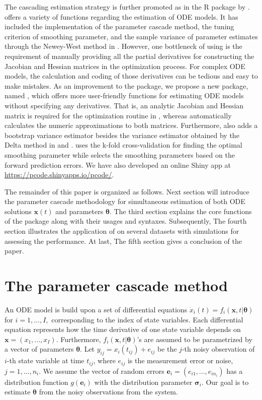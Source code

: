The cascading estimation strategy is further promoted as in the R package  by \cite{CollocInfer}.  offers a variety of functions regarding the estimation of ODE models. It has included the implementation of the parameter cascade method, the tuning criterion of smoothing parameter, and the sample variance of parameter estimates through the Newey-West method in \cite{neweywest}. However, one bottleneck of using  is the requirement of manually providing all the partial derivatives for constructing the Jacobian and Hessian matrices in the optimization process. For complex ODE models, the calculation and coding of those derivatives can be tedious and easy to make mistakes. As an improvement to the  package, we propose a new package, named , which offers more user-friendly functions for estimating ODE models without specifying any derivatives. That is, an analytic Jacobian and Hessian matrix is required for the optimization routine in , whereas  automatically calculates the numeric approximations to both matrices. Furthermore,  also adds a bootstrap variance estimator besides the variance estimator obtained by the Delta method in \cite{parcascade} and .  uses the k-fold cross-validation for finding the optimal smoothing parameter while  selects the smoothing parameters based on the forward prediction errors. We have also developed an online Shiny app at \url{https://pcode.shinyapps.io/pcode/}.

The remainder of this paper is organized as follows. Next section will introduce the parameter cascade methodology for simultaneous estimation of both ODE solutions $\bm{x}(t)$ and parameters $\bm{\theta}$. The third section explains the core functions of the package  along with their usages and syntaxes. Subsequently, The fourth section illustrates the application of  on several datasets with simulations for assessing the performance. At last, The fifth section gives a conclusion of the paper. 


\section{The parameter cascade method} \label{seq:method}
An ODE model is build upon a set of differential equations $\dot{x}_{i}(t) = f_{i}(\bm{x},t|\bm{\theta})$ for $i = 1,..., I,$ corresponding to the index of state variables. Each differential equation represents how the time derivative of one state variable depends on $\bm{x} = (x_{1},..., x_{I})$. Furthermore, $f_{i}(\bm{x},t|\bm{\theta})$'s are assumed to be parametrized by a vector of parameters $\bm{\theta}$. Let $y_{ij} = x_{i}(t_{ij}) +  e_{ij}$ be the $j$-th noisy observation of $i$-th state variable at time $t_{ij}$, where $e_{ij}$ is the measurement error or noise, $j = 1, ..., n_{i}$. We assume the vector of random errors $\bm{e}_{i} = (e_{i1},...,e_{in_{i}})$ has a distribution function $g(\bm{e}_{i})$ with the distribution parameter $\bm{\sigma}_{i}$. Our goal is to estimate $\bm{\theta}$ from the noisy observations from the system. 

